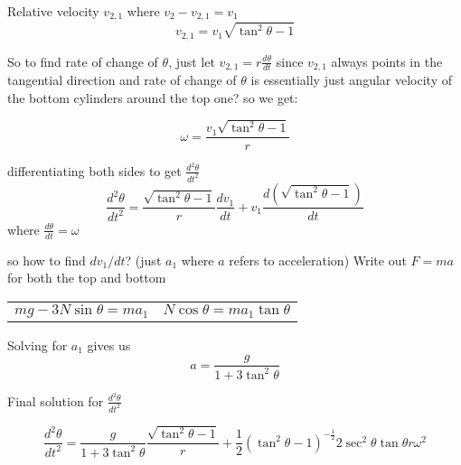 \documentclass[11pt]{article}
\begin{document}
\begin{enumerate}
Relative velocity $v_{2,1}$ where $v_2 -v_{2,1} = v_1$
\begin{equation}
    v_{2,1}=v_1\sqrt{\tan^2\theta-1}
\end{equation}

So to find rate of change of $\theta$, just let $v_{2,1}=r\frac{d\theta}{dt}$ since $v_{2,1}$ always points in the tangential direction and rate of change of $\theta$ is essentially just angular velocity of the bottom cylinders around the top one? so we get:

\begin{equation}
    \omega=\frac{v_1\sqrt{\tan^2\theta-1}}{r}
\end{equation}

differentiating both sides to get $\frac{d^2 \theta}{dt^2}$
\begin{equation}
    \frac{d^2 \theta}{dt^2}=\frac{\sqrt{\tan^2\theta-1}}{r}\frac{dv_1}{dt}+v_1\frac{d(\sqrt{\tan^2\theta-1})}{dt}
\end{equation}
where $\frac{d\theta}{dt}=\omega$

so how to find $dv_1/dt$? (just $a_1$ where $a$ refers to acceleration)
Write out $F=ma$ for both the top and bottom

\begin{center}
\begin{tabular}{p{5cm}p{5cm}}
    \begin{equation}
      mg-3N\sin\theta=ma_1
    \end{equation}
    &
    \begin{equation}
      N\cos\theta=ma_1\tan\theta
    \end{equation}
\end{tabular}
\end{center}

Solving for $a_1$ gives us 
\begin{equation}
    a=\frac{g}{1+3 \tan^2 \theta}
\end{equation}

Final solution for $\frac{d^2\theta}{dt^2}$

\begin{equation}
    \boxed{
    \frac{d^2\theta}{dt^2}=\frac{g}{1+3 \tan^2 \theta}\frac{\sqrt{\tan^2\theta-1}}{r}+\frac{1}{2} (\tan^2\theta-1)^{-\frac{1}{2}}2 \sec^2 \theta \tan \theta r\omega^2}
\end{equation}

\end{enumerate}
\end{document}
